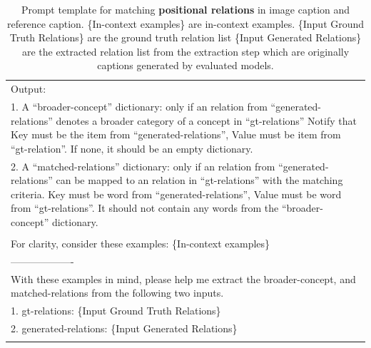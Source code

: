 \begin{table}[h!]
\begin{minipage}{0.95\textwidth}
\begin{tcolorbox}
\begin{tabular}{p{}}
        Output: \\
        1. A ``broader-concept'' dictionary: only if an relation from ``generated-relations'' denotes a broader category of a concept in ``gt-relations'' Notify that Key must be the item from ``generated-relations'', Value must be item from ``gt-relation''. If none, it should be an empty dictionary.\\
        2. A ``matched-relations'' dictionary: only if an relation from ``generated-relations'' can be mapped to an relation in ``gt-relations'' with the matching criteria. Key must be word from ``generated-relations'', Value must be word from ``gt-relations''. It should not contain any words from the ``broader-concept'' dictionary.\\\\

        For clarity, consider these examples: \textcolor[rgb]{0,0.7,0}{ \{In-context examples\} } \\
------------------- \\
        With these examples in mind, please help me extract the broader-concept, and matched-relations from the following two inputs. \\ 
        1. gt-relations: \textcolor[rgb]{0.8,0,0}{\{Input Ground Truth Relations\}}  \\
        2. generated-relations: \textcolor[rgb]{0.8,0,0}{\{Input Generated Relations\}} \\
\\

    \end{tabular}
\end{tcolorbox}
\caption{Prompt template for matching \textbf{positional relations} in image caption and reference caption.
\textcolor[rgb]{0,0.7,0}{ \{In-context examples\} } are in-context examples. \textcolor[rgb]{0.8,0,0}{\{Input Ground Truth Relations\}} are the ground truth relation list
\textcolor[rgb]{0.8,0,0}{\{Input Generated Relations\}} are the extracted relation list from the extraction step which are originally captions generated by evaluated models.}
    \label{tab:matching_pos}
\end{minipage}
\end{table}

